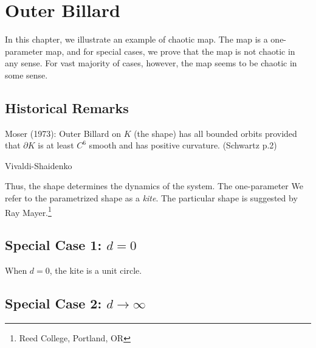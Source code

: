 \documentclass[12pt,twoside,draft]{book}
\begin{document}
\chapter{Outer Billard}
In this chapter, we illustrate an example of chaotic map.
The map is a one-parameter map, and for special cases, we prove that the map is not chaotic in any sense.
For vast majority of cases, however, the map seems to be chaotic in some sense.

\section{Historical Remarks}
Moser (1973):
Outer Billard on $K$ (the shape) has all bounded orbits provided that $\partial K$ is at least $C^6$ smooth and has positive curvature. (Schwartz p.2)

Vivaldi-Shaidenko

Thus, the shape determines the dynamics of the system.
The one-parameter 
We refer to the parametrized shape as a \textit{kite}.
The particular shape is suggested by Ray Mayer.\footnote{Reed College, Portland, OR}

\section{Special Case 1: $d = 0$}
When $d = 0$, the kite is a unit circle.

\section{Special Case 2: $d \to \infty$}
 



\printindex
\end{document}
